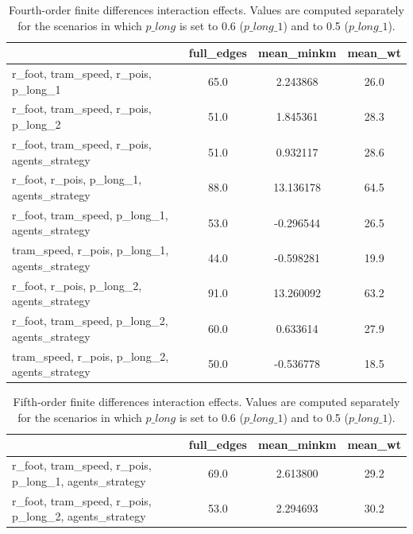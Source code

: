 
\begin{table}[H]
    \raggedright
    \scriptsize{
\begin{tabular}{lccc}
\toprule
{} &  full\_edges &  mean\_minkm &  mean\_wt \\
\midrule
r\_foot, tram\_speed, r\_pois, p\_long\_1          &        65.0 &    2.243868 &                  26.0 \\
r\_foot, tram\_speed, r\_pois, p\_long\_2          &        51.0 &    1.845361 &                  28.3 \\
r\_foot, tram\_speed, r\_pois, agents\_strategy   &        51.0 &    0.932117 &                  28.6 \\
r\_foot, r\_pois, p\_long\_1, agents\_strategy     &        88.0 &   13.136178 &                  64.5 \\
r\_foot, tram\_speed, p\_long\_1, agents\_strategy &        53.0 &   -0.296544 &                  26.5 \\
tram\_speed, r\_pois, p\_long\_1, agents\_strategy &        44.0 &   -0.598281 &                  19.9 \\
r\_foot, r\_pois, p\_long\_2, agents\_strategy     &        91.0 &   13.260092 &                  63.2 \\
r\_foot, tram\_speed, p\_long\_2, agents\_strategy &        60.0 &    0.633614 &                  27.9 \\
tram\_speed, r\_pois, p\_long\_2, agents\_strategy &        50.0 &   -0.536778 &                  18.5 \\
\bottomrule
\end{tabular}}
    \caption{Fourth-order finite differences interaction effects. Values are computed separately for the scenarios in which $p\_long$ is set to 0.6 ($p\_long\_1$) and to 0.5 ($p\_long\_1$).}
    \label{tab:quadriplets}
\end{table}


\begin{table}[H]
    \raggedright
    \scriptsize{
\begin{tabular}{lccc}
\toprule
{} &  full\_edges &  mean\_minkm &  mean\_wt \\
\midrule
r\_foot, tram\_speed, r\_pois, p\_long\_1, agents\_strategy &        69.0 &    2.613800 &                  29.2 \\
r\_foot, tram\_speed, r\_pois, p\_long\_2, agents\_strategy &        53.0 &    2.294693 &                  30.2 \\
\bottomrule
\end{tabular}}
    \caption{Fifth-order finite differences interaction effects. Values are computed separately for the scenarios in which $p\_long$ is set to 0.6 ($p\_long\_1$) and to 0.5 ($p\_long\_1$).}
    \label{tab:quintuplets}
\end{table}